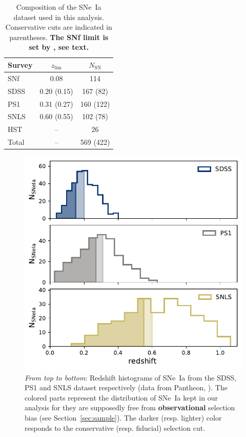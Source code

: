 \documentclass[referee]{aa}
\begin{document}
\begin{table}
    \centering
    \caption{Composition of the SNe~Ia dataset used in this analysis.
    Conservative cuts are indicated in parentheses. \textbf{The SNf limit is set
by \cite{rigault2020}, see text.}}
    \label{tab:sample}
    \begin{tabular}{l c c}
        \hline\hline
        Survey & $z_{\lim}$ & $N_{\mathrm{SN}}$ \\
        \hline
        SNf & 0.08 & 114 \\
        SDSS & 0.20 (0.15) & 167 (82)\\
        PS1 & 0.31 (0.27) & 160 (122)\\
        SNLS & 0.60 (0.55) & 102 (78)\\
        HST & -- & 26 \\
        \hline
        Total & -- & 569 (422) \\
        \hline
    \end{tabular}
\end{table}

\begin{figure}
    \centering
    \includegraphics[width=0.95\linewidth]{Article_figures/hist_surveys_cuts_55-cividis.pdf}
    \caption{\textit{From top to bottom}: Redshift histograms of SNe~Ia from the
        SDSS, PS1 and SNLS dataset respectively (data from Pantheon,
        \citealt{scolnic2018a}). The colored parts represent the distribution of
        SNe~Ia kept in our analysis for they are supposedly free from
    \textbf{observational} selection bias (see Section~\ref{sec:sample}). The
darker (resp. lighter) color responds to the conservative (resp. fiducial)
selection cut.}
    \label{fig:cuts}
\end{figure}
\end{document}
